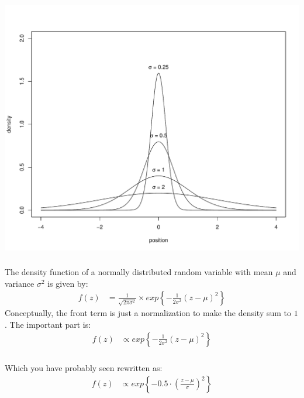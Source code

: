 \begin{frame}[fragile] \frametitle{}

\begin{center}
\includegraphics[width=\linewidth]{img/normal_density.pdf}
\end{center}

\end{frame}

\begin{frame}[fragile] \frametitle{}

The density function of a normally distributed random variable with
mean $\mu$ and variance $\sigma^2$ is given by:
\begin{align*}
f(z) &=  \frac{1}{\sqrt{2\pi\sigma^2}} \times
    exp \left\{ - \frac{1}{2\sigma^2} (z-\mu)^2 \right\}
\end{align*}
\pause Conceptually, the front term is just a normalization to make
the density sum to $1$. The important part is:
\begin{align*}
f(z) &\propto exp \left\{ - \frac{1}{2\sigma^2} (z-\mu)^2 \right\}
\end{align*}

\end{frame}

\begin{frame}[fragile] \frametitle{}

Which you have probably seen rewritten as:
\begin{align*}
f(z) &\propto exp \left\{ - 0.5 \cdot \left(\frac{z-\mu}{\sigma}\right)^2 \right\}
\end{align*}

\end{frame}

